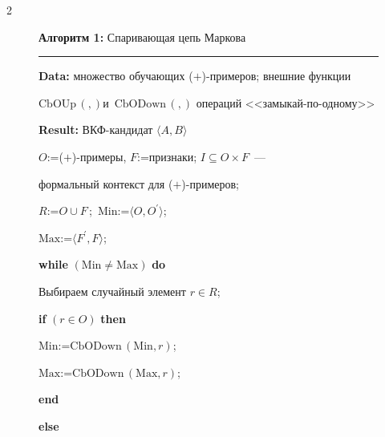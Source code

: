 \begin{multicols}{2}
\begin{figure}[b]
{    \vspace*{4pt}

    

    \textbf{Алгоритм 1:} {\small Спаривающая цепь Маркова}

    

        \vspace*{4pt}

    

    \hrule

    

        \vspace*{4pt}

        

    \textbf{Data:} множество обучающих ($+$)-примеров; внешние функции 

$\mathrm{CbOUp}\,(,)$и~$\mathrm{CbODown}\,(,)$ операций <<за\-мы\-кай-по-од\-но\-му>>

    

    \textbf{Result:} ВКФ-кандидат $\langle A, B\rangle$

    

    $O$\;:=\;($+$)-примеры, $F$\;:=\;признаки; $I\subseteq O\times F$~--- 

формальный контекст для ($+$)-примеров;

    

    $R$\;:=\;$O\cup F$\,;\ $\mathrm{Min}$\;:=\;$\langle O,O^\prime\rangle$;\ 

$\mathrm{Max}$\;:=\;$\langle F^\prime, F\rangle$;

    

    \textbf{while} $(\mathrm{Min}\not= \mathrm{Max})$ \textbf{do}

    

    \hspace*{5mm}Выбираем случайный элемент $r\in R$;

    

    \hspace*{5mm}\textbf{if} $(r\in O)$ \textbf{then}

    

    \hspace*{10mm}$\mathrm{Min}$\;:=\;$\mathrm{CbODown}\,(\mathrm{Min},r)$;\ 

$\mathrm{Max}$\;:=\;$\mathrm{CbODown}\,(\mathrm{Max},r)$;

    

    \hspace*{5mm}\textbf{end}

    

    \hspace*{5mm}\textbf{else}

}
\end{figure}
\end{multicols}
